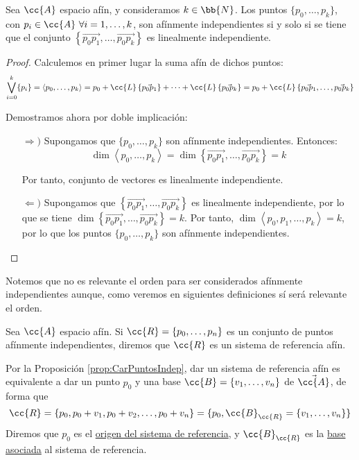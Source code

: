 \begin{prop}\label{prop:CarPuntosIndep}
    Sea $\cc{A}$ espacio afín, y consideramos $k\in \bb{N}$. Los puntos $\{p_0,\dots, p_k\}$, con $p_i\in \cc{A}~\forall i=1,\dots,k$, son afínmente independientes si y solo si se tiene que el conjunto $\left\{\vec{p_0p_1}, \dots, \vec{p_0p_k}\right\}$ es linealmente independiente.
\end{prop}
\begin{proof}
    Calculemos en primer lugar la suma afín de dichos puntos:
    \begin{equation*}
        \bigvee_{i=0}^k \{p_i\}
        = \langle p_0,\dots, p_k\rangle
        = p_0 + \cc{L}\left\{\vec{p_0p_1}\right\} + \dots + \cc{L}\left\{\vec{p_0p_k}\right\}
        = p_0 + \cc{L}\left\{ \vec{p_0p_1}, \dots, \vec{p_0p_k}\right\}
    \end{equation*}

    Demostramos ahora por doble implicación:
    \begin{itemize}
        \item[$\Longrightarrow)$] Supongamos que $\{p_0,\dots, p_k\}$ son afínmente independientes. Entonces:
        $$\dim \left\langle p_0,\dots, p_k\right\rangle = \dim \left\{ \vec{p_0p_1}, \dots, \vec{p_0p_k}\right\} = k$$
        
        Por tanto, conjunto de vectores es linealmente independiente.
        
        \item[$\Longleftarrow)$] Supongamos que $\left\{\vec{p_0p_1}, \dots, \vec{p_0p_k}\right\}$ es linealmente independiente,
        por lo que se tiene $\dim \left\{ \vec{p_0p_1}, \dots, \vec{p_0p_k}\right\}= k$. Por tanto, $\dim \left\langle p_0, p_1,\dots, p_k\right\rangle = k$,
        por lo que los puntos $\{p_0,\dots, p_k\}$ son afínmente independientes.
    \end{itemize}
\end{proof}


Notemos que no es relevante el orden para ser considerados afínmente independientes aunque, como veremos en siguientes definiciones sí será relevante el orden.


\begin{definicion}
    Sea $\cc{A}$ espacio afín. Si $\cc{R}=\{p_0,\dots,p_n\}$ es un conjunto de puntos afínmente independientes, diremos que $\cc{R}$ es un sistema de referencia afín.
\end{definicion}

Por la Proposición \ref{prop:CarPuntosIndep}, dar un sistema de referencia afín es equivalente a dar un punto $p_0$ y una base $\cc{B}=\{v_1,\dots, v_n\}$ de $\vec{\cc{A}}$, de forma que $$\cc{R}=\{p_0,p_0+v_1, p_0+v_2, \dots, p_0+v_n\}=\{p_0, \cc{B}_{\cc{R}}=\{v_1,\dots, v_n\}\}$$
Diremos que $p_0$ es el \ul{origen del sistema de referencia}, y $\cc{B}_{\cc{R}}$ es la \ul{base asociada} al sistema de referencia.\\

